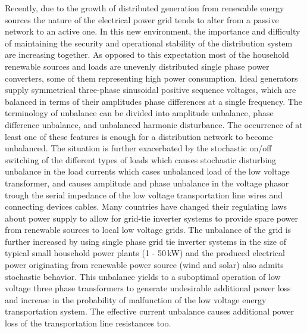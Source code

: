 
    Recently, due to the growth of distributed generation from renewable energy sources the nature of the electrical power grid tends to alter from a passive network to an active one.
    In this new environment, the importance and difficulty of maintaining the security and operational stability of the distribution system are increasing together. As opposed to
    this expectation most of the household renewable sources and loads are unevenly distributed single phase power converters, some of them representing high power consumption. Ideal generators supply symmetrical three-phase sinusoidal positive sequence voltages, which are balanced
    in terms of their amplitudes phase differences at a single frequency. The terminology of unbalance can be divided into amplitude unbalance, phase difference unbalance, and
    unbalanced harmonic disturbance. The occurrence of at least one of these features is enough for a distribution network to become unbalanced. The situation is further exacerbated
    by the stochastic on/off switching of the different types of loads which causes stochastic disturbing unbalance in the load currents which cases unbalanced load of the low voltage
    transformer, and causes amplitude and phase unbalance in the voltage phasor trough the serial impedance of the low voltage transportation line wires and connecting devices cables.
    Many countries have changed their regulating laws about power supply to allow for grid-tie inverter systems to provide spare power from renewable sources to local low voltage
    grids. The unbalance of the grid is further increased by using single phase grid tie inverter systems in the size of typical small household power plants (1 - 50\,kW) and the
    produced electrical power originating from renewable power source (wind and solar) also admits stochastic behavior. This unbalance yields to a suboptimal operation of low voltage three phase transformers to generate undesirable additional power loss and increase in the probability of malfunction of the low voltage energy transportation system. The effective current unbalance causes additional power loss of the transportation line resistances too.

